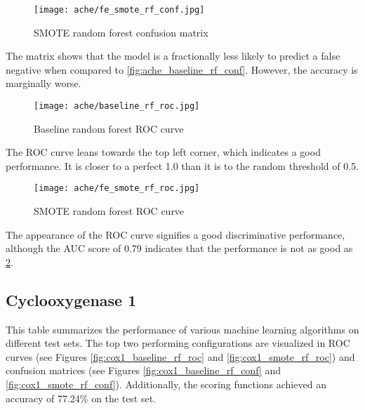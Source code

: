\begin{figure}[H]
    \begin{center}
        \caption[]{SMOTE random forest confusion matrix}
        \label{fig:ache_smote_rf_conf}
        \texttt{[image: ache/fe\_smote\_rf\_conf.jpg]}
    \end{center}
\end{figure}
The matrix shows that the model is a fractionally less likely to predict a false negative when compared to \ref*{fig:ache_baseline_rf_conf}. However, the accuracy is marginally worse.

\begin{figure}[H]
    \begin{center}
        \caption[]{Baseline random forest ROC curve}
        \label{fig:ache_baseline_rf_roc}
        \texttt{[image: ache/baseline\_rf\_roc.jpg]}
    \end{center}
\end{figure}
The ROC curve leans towards the top left corner, which indicates a good performance. It is closer to a perfect 1.0 than it is to the random threshold of 0.5.

\begin{figure}[H]
    \begin{center}
        \caption[]{SMOTE random forest ROC curve}
        \label{fig:ache_smote_rf_roc}
        \texttt{[image: ache/fe\_smote\_rf\_roc.jpg]}
    \end{center}
\end{figure}
The appearance of the ROC curve signifies a good discriminative performance, although the AUC score of 0.79 indicates that the performance is not as good as \ref*{fig:ache_baseline_rf_roc}.

\subsection{Cyclooxygenase 1}
This table summarizes the performance of various machine learning algorithms on different test sets.
The top two performing configurations are visualized in ROC curves (see Figures \ref{fig:cox1_baseline_rf_roc} and \ref{fig:cox1_smote_rf_roc})
and confusion matrices (see Figures \ref{fig:cox1_baseline_rf_conf} and \ref{fig:cox1_smote_rf_conf}). Additionally,
the scoring functions achieved an accuracy of 77.24\% on the test set.

